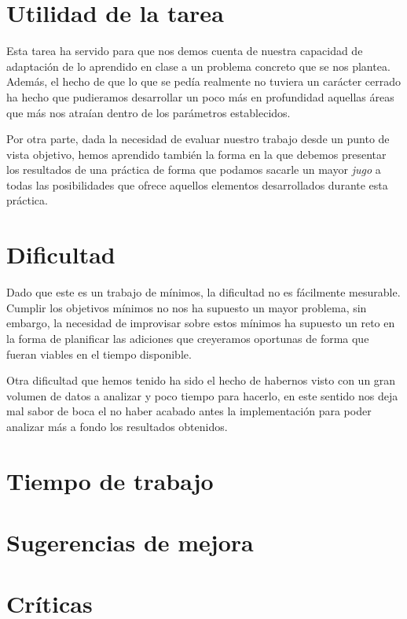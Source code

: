 \documentclass[a4paper]{report}
\begin{document}
	\section*{Utilidad de la tarea}
	Esta tarea ha servido para que nos demos cuenta de nuestra capacidad de adaptación de lo aprendido en clase a un problema concreto que se nos plantea. Además, el hecho de que lo que se pedía realmente no tuviera un carácter cerrado ha hecho que pudieramos desarrollar un poco más en profundidad aquellas áreas que más nos atraían dentro de los parámetros establecidos.
	
	Por otra parte, dada la necesidad de evaluar nuestro trabajo desde un punto de vista objetivo, hemos aprendido también la forma en la que debemos presentar los resultados de una práctica de forma que podamos sacarle un mayor \emph{jugo} a todas las posibilidades que ofrece aquellos elementos desarrollados durante esta práctica.
	\section*{Dificultad}
	Dado que este es un trabajo de mínimos, la dificultad no es fácilmente mesurable. Cumplir los objetivos mínimos no nos ha supuesto un mayor problema, sin embargo, la necesidad de improvisar sobre estos mínimos ha supuesto un reto en la forma de planificar las adiciones que creyeramos oportunas de forma que fueran viables en el tiempo disponible.
	
	Otra dificultad que hemos tenido ha sido el hecho de habernos visto con un gran volumen de datos a analizar y poco tiempo para hacerlo, en este sentido nos deja mal sabor de boca el no haber acabado antes la implementación para poder analizar más a fondo los resultados obtenidos.
	\section*{Tiempo de trabajo}
	
	\section*{Sugerencias de mejora}
	
	\section*{Críticas}
\end{document}
